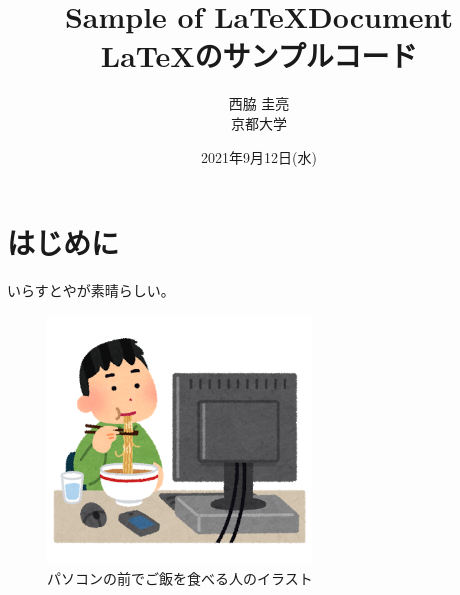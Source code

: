 \documentclass[uplatex]{jsarticle}
\begin{document}
\title{\bf{\LARGE{Sample of \LaTeX  Document} \\ \Large{\LaTeX のサンプルコード}}}
\author{西脇 圭亮\\京都大学}
\date{2021年9月12日(水)}
\maketitle

\section{はじめに}

いらすとやが素晴らしい。
\cite{art1}

\begin{figure}[h]
    \begin{center}
        \includegraphics[width=7cm]{images/syokuji_computer.png}
        \caption{パソコンの前でご飯を食べる人のイラスト}
        \label{fig:syokuji_computer}
    \end{center}
\end{figure}


\end{document}
